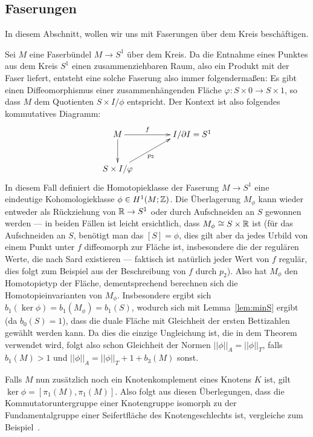     \subsection{Faserungen}
    \label{sec:fibrations}

    In diesem Abschnitt, wollen wir uns mit Faserungen über dem Kreis beschäftigen.
        
    \begin{bsp}
    	Sei $M$ eine Faserbündel $M\to S^1$ über dem Kreis. Da die Entnahme eines Punktes aus dem Kreis $S^1$ einen zusammenziehbaren Raum, also ein Produkt mit der Faser liefert, entsteht eine solche Faserung also immer folgendermaßen: Es gibt einen Diffeomorphismus einer zusammenhängenden Fläche $\varphi: S \times 0 \to S\times 1$, so dass $M$ dem Quotienten $S\times I/\phi$ entspricht. Der Kontext ist also folgendes kommutatives Diagramm:
    	\[
    		\begin{xy}
    			\xymatrix{M \ar[r]^f \ar[d] &**[r] I/\partial I = S^1 \\
    					S\times I /\varphi \ar[ru]_{p_2}}
    		\end{xy}
    	\]
    	In diesem Fall definiert die Homotopieklasse der Faserung $M \to S^1$ eine eindeutige Kohomologieklasse $\phi\in H^1(M;\mathbb{Z})$. Die Überlagerung $M_\phi$ kann wieder entweder als Rückziehung von $\mathbb{R} \to S^1$ oder durch Aufschneiden an $S$ gewonnen werden --- in beiden Fällen ist leicht ersichtlich, dass $M_\phi \cong S \times \mathbb{R}$ ist (für das Aufschneiden an $S$, benötigt man das $[S]=\phi$, dies gilt aber da jedes Urbild von einem Punkt unter $f$ diffeomorph zur Fläche ist, insbesondere die der regulären Werte, die nach Sard existieren --- faktisch ist natürlich jeder Wert von $f$ regulär, dies folgt zum Beispiel aus der Beschreibung von $f$ durch $p_2$). Also hat $M_\phi$ den Homotopietyp der Fläche, dementsprechend berechnen sich die Homotopieinvarianten von $M_\phi$. Insbesondere ergibt sich $b_1(\ker\phi) =b_1(M_\phi)= b_1(S)$, wodurch sich mit Lemma~\ref{lem:minS} ergibt (da $b_0(S)=1$), dass die duale Fläche mit Gleichheit der ersten Bettizahlen gewählt werden kann. Da dies die einzige Ungleichung ist, die in dem Theorem verwendet wird, folgt also schon Gleichheit der Normen $||\phi||_A = ||\phi||_T$, falls $b_1(M)>1$ und $||\phi||_A = ||\phi||_T+1+b_3(M)$ sonst.

        Falls $M$ nun zusätzlich noch ein Knotenkomplement eines Knotens $K$ ist, gilt $\ker\phi = [\pi_1(M),\pi_1(M)]$. Also folgt aus diesen Überlegungen, dass die Kommutatoruntergruppe einer Knotengruppe isomorph zu der Fundamentalgruppe einer Seifertfläche des Knotengeschlechts ist, vergleiche zum Beispiel~\cite[Theorem 4.6]{Burde.2003}.


\end{bsp}
